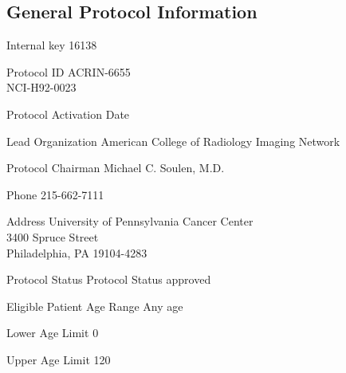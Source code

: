 \documentclass[12pt]{article}
\newcounter{qC}
\newcommand{\entrylabel}[1]{\mbox{\bfseries{#1:}}\hfil}
\newenvironment{entry}
   {\begin{list}{}%
       {\renewcommand{\makelabel}{\entrylabel}%
        \setlength{\labelwidth}{170pt}%
       \setlength{\itemsep}{-5pt}%
        \setlength{\leftmargin}{\labelwidth+\labelsep}%
       }%
   }%
{\end{list}}
\newcommand{\ProtocolID}{ACRIN-6655}
\begin{document}
\subsection*{General Protocol Information}
\par
\setcounter{qC}{0}
\begin{entry}
\item[Internal key]               16138 
\item[Protocol ID]                \ProtocolID
                                  \\ NCI-H92-0023
\item[Protocol Activation Date]           
\item[Lead Organization]          American College of Radiology Imaging Network
\item[Protocol Chairman]          Michael C. Soulen, M.D.
\item[Phone]  215-662-7111
\item[Address] University of Pennsylvania Cancer Center \\
                                  3400 Spruce Street \\
                                  Philadelphia, PA  19104-4283
\item[Protocol Status]            Protocol Status approved

\item[Eligible Patient Age Range] Any age
\item[Lower Age Limit]            0
\item[Upper Age Limit]            120
\end{entry}

\setcounter{qC}{0}
\end{document}
